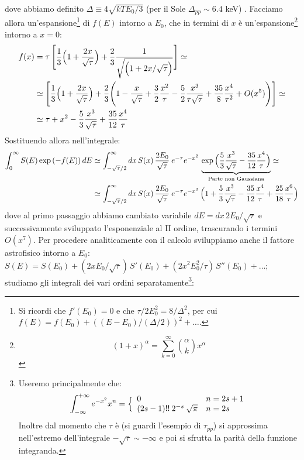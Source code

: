 dove abbiamo definito $\Delta \equiv 4\sqrt{kTE_0/3}$ (per il Sole $\Delta_{pp}\sim 6.4$ keV)%
. Facciamo allora un'espansione\footnote{Si ricordi che $f'(E_0)=0$ e che $\tau/2E_0^2 = 8/\Delta^2$, per cui $f(E) = f(E_0) + ((E-E_0)/(\Delta/2))^2 + \dots$.} di $f(E)$ intorno a $E_0$, che in termini di $x$ è un'espansione\footnote{%
$$(1+x)^\alpha = \sum_{k=0}^\infty \binom{\alpha}{k}x^\alpha$$%
} intorno a $x=0$:
\begin{align*}
f(x) &= \tau \, \Biggl [ \frac{1}{3} \Bigl ( 1+\frac{2x}{\sqrt{\tau}} \Bigr ) + \frac{2}{3} \frac{1}{\sqrt{\Bigl ( 1+2x/\sqrt{\tau} \Bigr )}} \Biggr ] \simeq\\
&\simeq \Biggl [ \frac{1}{3} \Bigl ( 1+\frac{2x}{\sqrt{\tau}} \Bigr ) + \frac{2}{3} \Biggl ( 1-\frac{x}{\sqrt{\tau}} +\frac{3}{2}\frac{x^2}{\tau} - \frac{5}{2} \frac{x^3}{\tau\sqrt{\tau}}+\frac{35}{8}\frac{x^4}{\tau^2}+ O(x^5) \Biggr )  \Biggr ] \simeq \\
&\simeq \tau  + x^2 - \frac{5}{3} \frac{x^3}{\sqrt{\tau}} + \frac{35}{12}\frac{x^4}{\tau}
\end{align*}
Sostituendo allora nell'integrale:
\begin{displaymath}
\begin{aligned}
\int_0^\infty S(E) \exp{(-f(E))}\,dE &\simeq \int_{-\sqrt{\tau}/2}^\infty dx\, S(x) \, \frac{2E_0}{\sqrt{\tau}} \: e^{-\tau} e^{-x^2} \, \underbrace{\exp{\Bigl ( \frac{5}{3} \frac{x^3}{\sqrt{\tau}} - \frac{35}{12}\frac{x^4}{\tau} \Bigr )}}_\text{Parte non Gaussiana} \simeq \\
&\simeq  \int_{-\sqrt{\tau}/2}^\infty dx\, S(x) \, \frac{2E_0}{\sqrt{\tau}} \: e^{-\tau} e^{-x^2} \, \Bigl ( 1+\frac{5}{3} \frac{x^3}{\sqrt{\tau}} - \frac{35}{12}\frac{x^4}{\tau} + \frac{25}{18} \frac{x^6}{\tau} \Bigr )
\end{aligned}
\end{displaymath}
dove al primo passaggio abbiamo cambiato variabile $dE = dx\,2E_0/\sqrt{\tau}$ e successivamente sviluppato l'esponenziale al II ordine, trascurando i termini $O(x^7)$. Per procedere analiticamente con il calcolo sviluppiamo anche il fattore astrofisico intorno a $E_0$: $S(E) = S(E_0) + (2xE_0/\sqrt{\tau})\,S'(E_0) + (2x^2E_0^2/\tau)\,S''(E_0)+\dots$; studiamo gli integrali dei vari ordini separatamente\footnote{Useremo principalmente che:
$$\int_{-\infty}^{+\infty} e^{-x^2} x^n = \Bigl \{ %
\begin{array}{ll}
    0 & n=2s+1 \\
    (2s-1)!!\:2^{-s} \: \sqrt{\pi} & n=2s
\end{array}%
$$%
Inoltre dal momento che $\tau$ è  (si guardi l'esempio di $\tau_{pp}$) si approssima nell'estremo dell'integrale $-\sqrt{\tau}\sim-\infty$ e poi si sfrutta la parità della funzione integranda.}:
